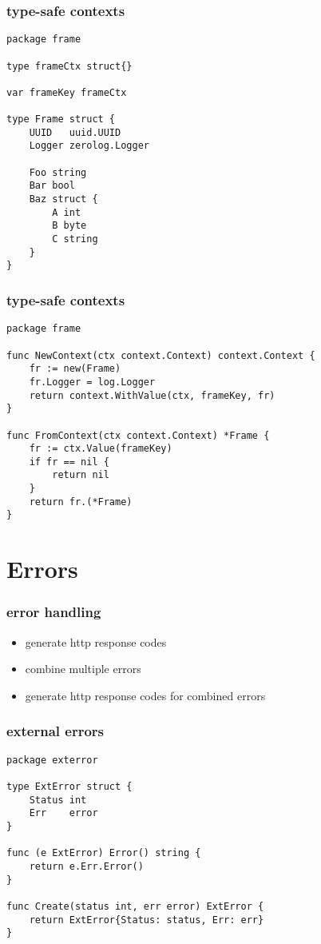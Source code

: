 \documentclass{beamer}
\begin{document}
\begin{frame}[fragile]
\frametitle{type-safe contexts}
\begin{lstlisting}[basicstyle=\ttfamily\footnotesize]
package frame

type frameCtx struct{}

var frameKey frameCtx

type Frame struct {
	UUID   uuid.UUID
	Logger zerolog.Logger

	Foo string
	Bar bool
	Baz struct {
		A int
		B byte
		C string
	}
}
\end{lstlisting}
\end{frame}


\begin{frame}[fragile]
\frametitle{type-safe contexts}
\begin{lstlisting}[basicstyle=\ttfamily\footnotesize]
package frame

func NewContext(ctx context.Context) context.Context {
	fr := new(Frame)
	fr.Logger = log.Logger
	return context.WithValue(ctx, frameKey, fr)
}

func FromContext(ctx context.Context) *Frame {
	fr := ctx.Value(frameKey)
	if fr == nil {
		return nil
	}
	return fr.(*Frame)
}
\end{lstlisting}
\end{frame}

\section{Errors}

\begin{frame}
\frametitle{error handling}
\begin{itemize}
\item generate http response codes
\item combine multiple errors
\item generate http response codes for combined errors
\end{itemize}
\end{frame}

\begin{frame}[fragile]
\frametitle{external errors}
\begin{lstlisting}[basicstyle=\ttfamily\footnotesize]
package exterror

type ExtError struct {
	Status int
	Err    error
}

func (e ExtError) Error() string {
	return e.Err.Error()
}

func Create(status int, err error) ExtError {
	return ExtError{Status: status, Err: err}
}
\end{lstlisting}
\end{frame}
\end{document}
